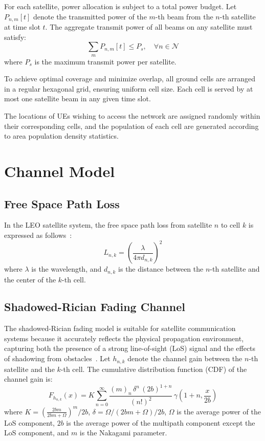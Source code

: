 For each satellite, power allocation is subject to a total power budget. Let $P_{n,m}[t]$ denote the transmitted power of the $m$-th beam from the $n$-th satellite at time slot $t$. The aggregate transmit power of all beams on any satellite must satisfy:
\begin{equation}
    \sum_{m} P_{n,m}[t] \leq P_s, \quad \forall n \in \mathcal{N}
\end{equation}
where $P_s$ is the maximum transmit power per satellite.

To achieve optimal coverage and minimize overlap, all ground cells are arranged in a regular hexagonal grid, ensuring uniform cell size. Each cell is served by at most one satellite beam in any given time slot.

The locations of UEs wishing to access the network are assigned randomly within their corresponding cells, and the population of each cell are generated according to area population density statistics.

\section{Channel Model}

\subsection{Free Space Path Loss}
In the LEO satellite system, the free space path loss from satellite $n$ to cell $k$ is expressed as follows~\cite{Satellite-Multi-Beam}:
\begin{equation}
    L_{n,k} = \left(\frac{\lambda}{4\pi d_{n,k}}\right)^2
\end{equation}
where $\lambda$ is the wavelength, and $d_{n,k}$ is the distance between the $n$-th satellite and the center of the $k$-th cell.

\subsection{Shadowed-Rician Fading Channel}
The shadowed-Rician fading model is suitable for satellite communication systems because it accurately reflects the physical propagation environment, capturing both the presence of a strong line-of-sight (LoS) signal and the effects of shadowing from obstacles~\cite{channel-model}. Let $h_{n,k}$ denote the channel gain between the $n$-th satellite and the $k$-th cell. The cumulative distribution function (CDF) of the channel gain is:
\begin{equation}
    F_{h_{n,k}}(x) = K \sum_{n=0}^{\infty} \frac{(m)_n \, \delta^n \, (2b)^{1+n}}{(n!)^2} \, \gamma\left(1+n, \frac{x}{2b}\right)
\end{equation}
where $K = \left(\frac{2bm}{2bm+\Omega}\right)^m/2b$, $\delta = \Omega/(2bm+\Omega)/2b$, $\Omega$ is the average power of the LoS component, $2b$ is the average power of the multipath component except the LoS component, and $m$ is the Nakagami parameter.

